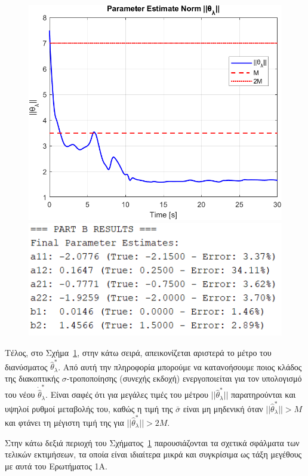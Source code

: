 \documentclass[12pt]{article} %
\numberwithin{equation}{section}  %
\begin{document}
\begin{figure}[ht!]
    \centering
    \begin{minipage}{0.48\textwidth}
        \centering
        \includegraphics[width=0.65\linewidth]{plots/plot6_12_theta_o1.png}
    \end{minipage}
    \hfill
    \begin{minipage}{0.48\textwidth}
        \centering
        \includegraphics[width=0.65\linewidth]{plots/plot6_13_logs_o1.png}
    \end{minipage}
    
    \caption{}
    \label{fig:B_est_o1}
\end{figure}

Τέλος, στο Σχήμα~\ref{fig:B_est_o1}, στην κάτω σειρά, απεικονίζεται αριστερά το μέτρο του διανύσματος $\hat\theta_\lambda^*$. 
Από αυτή την πληροφορία μπορούμε να κατανοήσουμε ποιος κλάδος της διακοπτικής $\sigma$-τροποποίησης (συνεχής εκδοχή) ενεργοποιείται για τον υπολογισμό του νέου $\dot{\hat\theta}_\lambda^*$. 
Είναι σαφές ότι για μεγάλες τιμές του μέτρου $||\hat\theta_\lambda^*||$ παρατηρούνται και υψηλοί ρυθμοί μεταβολής του, 
καθώς η τιμή της $\bar\sigma$ είναι μη μηδενική όταν $||\hat\theta_\lambda^*|| > M$ και φτάνει τη μέγιστη τιμή της για $||\hat\theta_\lambda^*|| > 2M$.

Στην κάτω δεξιά περιοχή του Σχήματος~\ref{fig:B_est_o1} παρουσιάζονται τα σχετικά σφάλματα των τελικών εκτιμήσεων, 
τα οποία είναι ιδιαίτερα μικρά και συγκρίσιμα ως τάξη μεγέθους με αυτά του Ερωτήματος 1Α.
\end{document}

